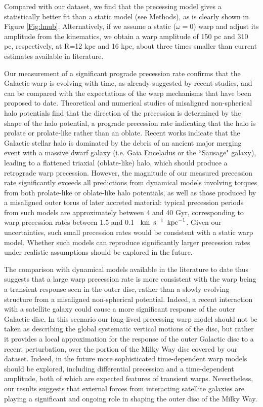 \documentclass{nature}
\newcommand{\kmskpc}{$\text{\, km} \text{\, s}^{-1} \text{\, kpc}^{-1}$}
\begin{document}
Compared with our dataset, we find that the precessing model gives a statistically better fit than a static model (see Methods), as is clearly shown in Figure \ref{Fig:lmub}. Alternatively, if we assume a static ($\omega=0$) warp and adjust its amplitude from the kinematics, we obtain a warp amplitude of 150 pc and 310 pc, respectively, at R=12 kpc and 16 kpc, about three times smaller than current estimates available in literature. 


Our measurement of a significant prograde precession rate confirms that the Galactic warp is evolving with time, as already suggested by recent studies\cite{Amores:2017,Chen:2019}, and can be compared with the expectations of the warp mechanisms that have been proposed to date. Theoretical and numerical studies of misaligned non-spherical halo potentials find that the direction of the precession is determined by the shape of the halo potential, a prograde precession rate indicating that the halo is prolate or prolate-like rather than an oblate\cite{Sparke:1988,Ideta:2000,Jeon:2009,Dubinski:2009}. Recent works indicate that the Galactic stellar halo is dominated by the debris of an ancient major merging event with a massive dwarf galaxy (i.e. Gaia Enceladus\cite{Helmi:2018} or the ``Sausage" galaxy\cite{Belokurov:2018}), leading to a flattened triaxial (oblate-like) halo\cite{Iorio:2019}, which should produce a retrograde warp precession. However, the magnitude of our measured precession rate significantly exceeds all predictions from dynamical models involving torques from both prolate-like or oblate-like halo potentials, as well as those produced by a misaligned outer torus of later accreted material\cite{Jiang:1999,Shen:2006,Jeon:2009,Dubinski:2009}: typical precession periods from such models are approximately between 4 and 40 Gyr, corresponding to warp precession rates between 1.5 and 0.1 \kmskpc. Given our uncertainties, such small precession rates would be consistent with a static warp model. Whether such models can reproduce significantly larger precession rates under realistic assumptions should be explored in the future. 
 
The comparison with dynamical models available in the literature to date thus suggests that a large warp precession rate is more consistent with the warp being a transient response seen in the outer disc, rather than a slowly evolving structure from a misaligned non-spherical potential. Indeed, a recent interaction with a satellite galaxy could cause a more significant response of the outer Galactic disc\cite{Weinberg:2006,DOnghia:2016,Laporte:2019}. In this scenario our long-lived precessing warp model should not be taken as describing the global systematic vertical motions of the disc, but rather it provides a local approximation for the response of the outer Galactic disc to a recent perturbation, over the portion of the Milky Way disc covered by our dataset. Indeed, in the future more sophisticated time-dependent warp models should be explored, including differential precession and a time-dependent amplitude, both of which are expected features of transient warps. Nevertheless, our results suggests that external forces from interacting satellite galaxies are playing a significant and ongoing role in shaping the outer disc of the Milky Way.
\end{document}
